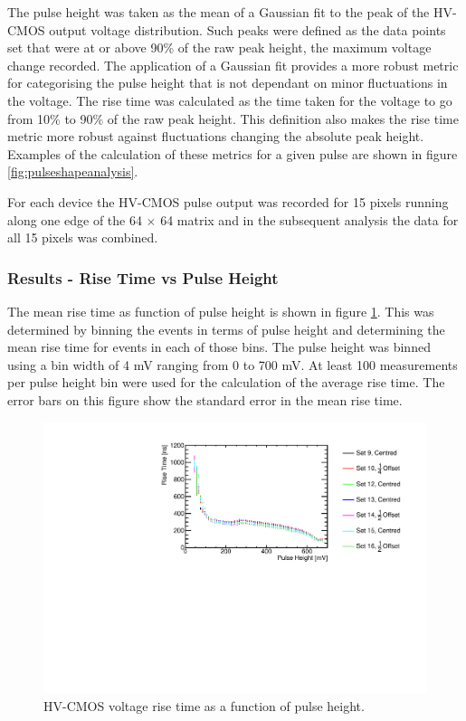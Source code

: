 The pulse height was taken as the mean of a Gaussian fit to the peak of the HV-CMOS output voltage distribution.  Such peaks were defined as the data points set that were at or above 90\% of the raw peak height, the maximum voltage change recorded.  The application of a Gaussian fit provides a more robust metric for categorising the pulse height that is not dependant on minor fluctuations in the voltage.  The rise time was calculated as the time taken for the voltage to go from 10\% to 90\% of the raw peak height.  This definition also makes the rise time metric more robust against fluctuations changing the absolute peak height.  Examples of the calculation of these metrics for a given pulse are shown in figure \ref{fig:pulseshapeanalysis}.

For each device the HV-CMOS pulse output was recorded for 15 pixels running along one edge of the 64 $\times$ 64 matrix and in the subsequent analysis the data for all 15 pixels was combined.


\subsubsection{Results -  Rise Time vs Pulse Height}
\label{sec:resultsrisetimepulseheight}
The mean rise time as function of pulse height is shown in figure \ref{fig:risetime}.  This was determined by binning the events in terms of pulse height and determining the mean rise time for events in each of those bins.  The pulse height was binned using a bin width of 4 mV ranging from 0 to 700 mV.  At least 100 measurements per pulse height bin were used for the calculation of the average rise time.  The error bars on this figure show the standard error in the mean rise time.  

\begin{figure}
\centering
\includegraphics[width=1.0\textwidth]{CLICdpVertex/Plots/RadSourceAnalysis/AllSETs_RiseTime_PulseHeight.pdf}
\caption[HV-CMOS voltage rise time as a function of pulse height.]{HV-CMOS voltage rise time as a function of pulse height.}
\label{fig:risetime}
\end{figure}


